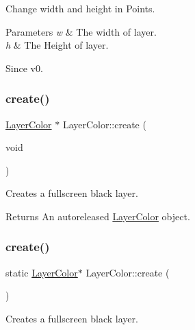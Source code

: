 Change width and height in Points.


\begin{DoxyParams}{Parameters}
{\em w} & The width of layer. \\
\hline
{\em h} & The Height of layer. \\
\hline
\end{DoxyParams}
\begin{DoxySince}{Since}
v0. 
\end{DoxySince}
\mbox{\label{classLayerColor_ad4e1fadb3564da142f3dae592ab68f9c}} 
\subsubsection{\texorpdfstring{create()}{create()}\hspace{0.1cm}{\footnotesize\ttfamily [1/6]}}
{\footnotesize\ttfamily \hyperlink{classLayerColor}{Layer\+Color} $\ast$ Layer\+Color\+::create (\begin{DoxyParamCaption}\item[{void}]{ }\end{DoxyParamCaption})\hspace{0.3cm}{\ttfamily [static]}}

Creates a fullscreen black layer.

\begin{DoxyReturn}{Returns}
An autoreleased \hyperlink{classLayerColor}{Layer\+Color} object. 
\end{DoxyReturn}
\mbox{\label{classLayerColor_a20b32d181d75de6c70e93eb107b6c6e4}} 
\subsubsection{\texorpdfstring{create()}{create()}\hspace{0.1cm}{\footnotesize\ttfamily [2/6]}}
{\footnotesize\ttfamily static \hyperlink{classLayerColor}{Layer\+Color}$\ast$ Layer\+Color\+::create (\begin{DoxyParamCaption}{ }\end{DoxyParamCaption})\hspace{0.3cm}{\ttfamily [static]}}

Creates a fullscreen black layer.

